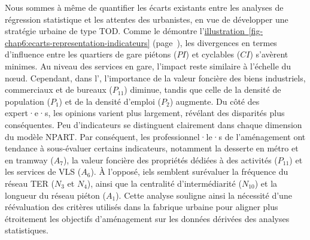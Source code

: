 \begin{refsegment}
Nous sommes à même de quantifier les écarts existants entre les analyses de régression statistique et les attentes des urbanistes, en vue de développer une stratégie urbaine de type \acrshort{TOD}. Comme le démontre l'\hyperref[fig-chap6:ecarts-representation-indicateurs]{illustration~\ref{fig-chap6:ecarts-representation-indicateurs}} (page~\pageref{fig-chap6:ecarts-representation-indicateurs}), les divergences en termes d'influence entre les quartiers de gare piétons (\(PI\)) et cyclables (\(CI\)) s'avèrent minimes. Au niveau des services en gare, l'impact reste similaire à l'échelle du nœud. Cependant, dans l', l'importance de la valeur foncière des biens industriels, commerciaux et de bureaux (\(P_{11}\)) diminue, tandis que celle de la densité de population (\(P_{1}\)) et de la densité d'emploi (\(P_{2}\)) augmente. Du côté des expert·e·s, les opinions varient plus largement, révélant des disparités plus conséquentes. Peu d'indicateurs se distinguent clairement dans chaque dimension du modèle \acrshort{NPART}. Par conséquent, les professionnel·le·s de l'aménagement ont tendance à sous-évaluer certains indicateurs, notamment la desserte en métro et en tramway (\(A_{7}\)), la valeur foncière des propriétés dédiées à des activités (\(P_{11}\)) et les services de \acrshort{VLS} (\(A_{6}\)). À l'opposé, iels semblent surévaluer la fréquence du réseau \acrshort{TER} (\(N_{3}\) et \(N_{4}\)), ainsi que la centralité d'intermédiarité (\(N_{10}\)) et la longueur du réseau piéton (\(A_{1}\)). Cette analyse souligne ainsi la nécessité d'une réévaluation des critères utilisés dans la fabrique urbaine pour aligner plus étroitement les objectifs d'aménagement sur les données dérivées des analyses statistiques.%


\end{refsegment}
